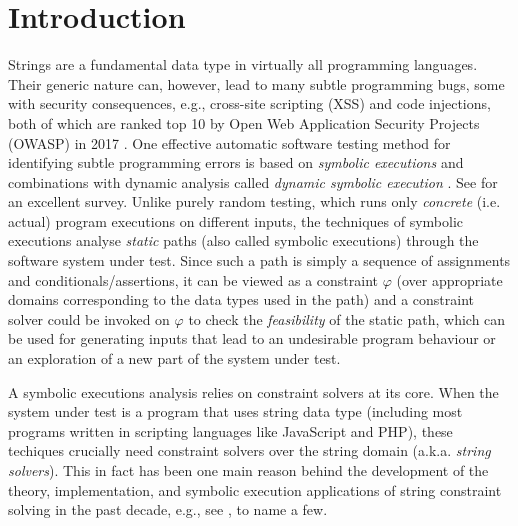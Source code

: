 \section{Introduction}
\label{sec:intro}

Strings are a fundamental data type in virtually all programming languages.
Their generic nature can, however, lead to many subtle programming 
bugs, some with security consequences, e.g., cross-site scripting
(XSS) and code injections, both of which are ranked top 10 by Open Web
Application Security Projects (OWASP) in 2017 \cite{owasp17}. One effective
automatic software testing method for identifying subtle programming errors
is based on \emph{symbolic executions} 
\cite{king76} and combinations with dynamic analysis
called \emph{dynamic symbolic execution} \cite{jalangi,DART,EXE,CUTE,KLEE}.
See \cite{symbex-survey} for an excellent survey. Unlike purely random testing,
which runs only \emph{concrete} (i.e. actual) program executions on different 
inputs, the techniques of symbolic executions analyse \emph{static} paths
(also called symbolic executions) through the software system under test.
Since such a path is simply a sequence of assignments and
conditionals/assertions, it can be viewed as a constraint $\varphi$ (over 
appropriate domains corresponding to the data types used in the path) and a 
constraint solver could be invoked on $\varphi$ to check the \emph{feasibility}
of the static path, which can be used for generating inputs that lead to 
an undesirable program behaviour or an exploration of a new part of the
system under test.

A symbolic executions analysis relies on constraint solvers at its core. When 
the system
under test is a program that uses string data type (including most programs 
written in scripting languages like JavaScript and PHP), these techiques 
crucially need constraint solvers over the string domain (a.k.a. \emph{string 
solvers}). This in fact has been one main reason behind the development of
the theory, implementation, and symbolic execution applications of string constraint 
solving in the past decade, e.g., see 
\cite{BTV09,Berkeley-JavaScript,HAMPI,Stranger,Vijay-length,YABI14,Abdulla14,LB16,fang-yu-circuits,Abdulla17,CCHLW18,HJLRV18,S3,TCJ16,Z3-str,cvc4,BCFJKKV08,RVG12,jalangi,expose},
to name a few. 


